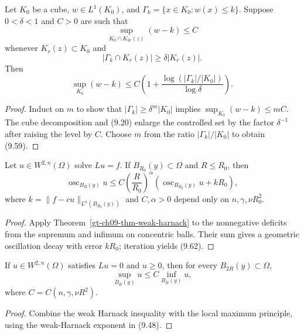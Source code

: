 \begin{lemma}
\label{gt-ch09-lem-cube-level-set-growth}
Let $K_0$ be a cube, $w\in L^1(K_0)$, and
$\Gamma_k=\{x\in K_0:w(x)\le k\}$.  Suppose $0<\delta<1$ and $C>0$ are
such that
\begin{equation}\tag{9.57}
\sup_{K_0\cap K_{3r}(z)}(w-k)\le C
\end{equation}
whenever $K_r(z)\subset K_0$ and
\begin{equation}\tag{9.58}
|\Gamma_k\cap K_r(z)|\ge\delta|K_r(z)|.
\end{equation}
Then
\begin{equation}\tag{9.59}
\sup_{K_0}(w-k)\le
C\left(1+\frac{\log(|\Gamma_k|/|K_0|)}{\log\delta}\right).
\end{equation}
\end{lemma}
\begin{proof}
\sketch Induct on $m$ to show that
$|\Gamma_k|\ge\delta^m|K_0|$ implies
$\sup_{K_0}(w-k)\le mC$.  The cube decomposition and (9.20) enlarge the
controlled set by the factor $\delta^{-1}$ after raising the level by $C$.
Choose $m$ from the ratio $|\Gamma_k|/|K_0|$ to obtain (9.59).
\end{proof}

\begin{corollary}
\label{gt-ch09-cor-interior-holder-oscillation}
Let $u\in W^{2,n}(\Omega)$ solve $Lu=f$.  If
$B_{R_0}(y)\subset\Omega$ and $R\le R_0$, then
\begin{equation}\tag{9.62}
\operatorname{osc}_{B_R(y)}u\le
C\left(\frac R{R_0}\right)^\alpha
\left(\operatorname{osc}_{B_{R_0}(y)}u+kR_0\right),
\end{equation}
where $k=\|f-cu\|_{L^n(B_{R_0}(y))}$ and
$C,\alpha>0$ depend only on $n,\gamma,\nu R_0^2$.
\end{corollary}
\begin{proof}
\sketch Apply Theorem~\ref{gt-ch09-thm-weak-harnack} to the nonnegative
deficits from the supremum and infimum on concentric balls.  Their sum gives
a geometric oscillation decay with error $kR_0$; iteration yields (9.62).
\end{proof}

\begin{corollary}
\label{gt-ch09-cor-interior-harnack}
If $u\in W^{2,n}(\Omega)$ satisfies $Lu=0$ and $u\ge0$, then for every
$B_{2R}(y)\subset\Omega$,
\begin{equation}\tag{9.63}
\sup_{B_R(y)}u\le C\inf_{B_R(y)}u,
\end{equation}
where $C=C(n,\gamma,\nu R^2)$.
\end{corollary}
\begin{proof}
\sketch Combine the weak Harnack inequality with the local maximum principle,
using the weak-Harnack exponent in (9.48).
\end{proof}

